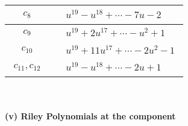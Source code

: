 \documentclass[1p]{elsarticle_modified}
\theoremstyle{definition}
\begin{document}
\begin{tabular}{m{50pt}|m{274pt}}
\hline $$\begin{aligned}c_{8}\end{aligned}$$&$\begin{aligned}
&u^{19}- u^{18}+\cdots-7 u-2
\end{aligned}$\\
\hline $$\begin{aligned}c_{9}\end{aligned}$$&$\begin{aligned}
&u^{19}+2 u^{17}+\cdots- u^2+1
\end{aligned}$\\
\hline $$\begin{aligned}c_{10}\end{aligned}$$&$\begin{aligned}
&u^{19}+11 u^{17}+\cdots-2 u^2-1
\end{aligned}$\\
\hline $$\begin{aligned}c_{11},c_{12}\end{aligned}$$&$\begin{aligned}
&u^{19}- u^{18}+\cdots-2 u+1
\end{aligned}$\\
\hline
\end{tabular}\\~\\
\newpage\renewcommand{\arraystretch}{1}
\flushleft \textbf{(v) Riley Polynomials at the component}\newline \\
\end{document}
